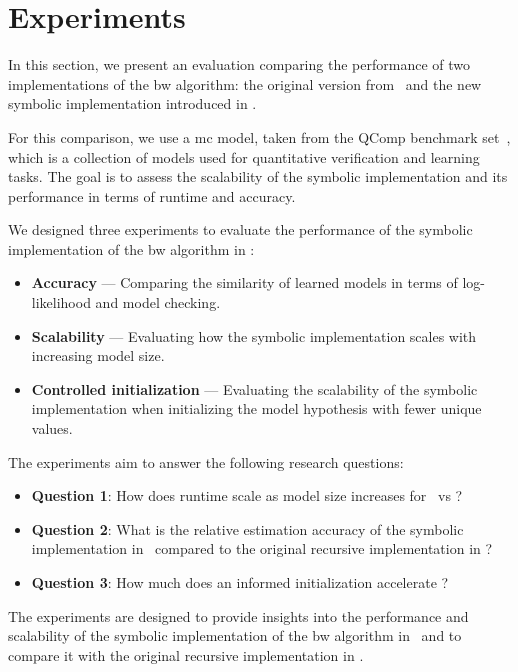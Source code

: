 \section{Experiments}\label{sec:experiments}
In this section, we present an evaluation comparing the performance of two implementations of the \gls{bw} algorithm: the original version from \Jajapy\ and the new symbolic implementation introduced in \JajapyTwo.

For this comparison, we use a \gls{mc} model, taken from the QComp benchmark set~\cite{hartmanns2019quantitative}, which is a collection of models used for quantitative verification and learning tasks.
The goal is to assess the scalability of the symbolic implementation and its performance in terms of runtime and accuracy.

We designed three experiments to evaluate the performance of the symbolic implementation of the \gls{bw} algorithm in \JajapyTwo:

\begin{itemize}
    \item \textbf{Accuracy} — Comparing the similarity of learned models in terms of log-likelihood and model checking.
    \item \textbf{Scalability} — Evaluating how the symbolic implementation scales with increasing model size.
    \item \textbf{Controlled initialization} — Evaluating the scalability of the symbolic implementation when initializing the model hypothesis with fewer unique values.
\end{itemize}

The experiments aim to answer the following research questions:
\begin{itemize}
    \item \textbf{Question 1}: How does runtime scale as model size increases for \JajapyTwo\ vs \Jajapy?
    \item \textbf{Question 2}: What is the relative estimation accuracy of the symbolic implementation in \JajapyTwo\ compared to the original recursive implementation in \Jajapy?
    \item \textbf{Question 3}: How much does an informed initialization accelerate \JajapyTwo?
\end{itemize}


The experiments are designed to provide insights into the performance and scalability of the symbolic implementation of the \gls{bw} algorithm in \JajapyTwo\ and to compare it with the original recursive implementation in \Jajapy.


